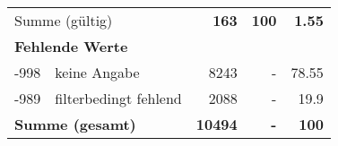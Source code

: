 \begin{longtable}{lXrrr}
     \midrule
     \multicolumn{2}{l}{Summe (gültig)} &
       \textbf{\num{163}} &
     \textbf{100} &
       \textbf{\num[round-mode=places,round-precision=2]{1,55}} \\
     \multicolumn{5}{l}{\textbf{Fehlende Werte}}\\
       -998 &
       keine Angabe &
         \num{8243} &
        - &
         \num[round-mode=places,round-precision=2]{78,55} \\
       -989 &
       filterbedingt fehlend &
         \num{2088} &
        - &
         \num[round-mode=places,round-precision=2]{19,9} \\
     \midrule
     \multicolumn{2}{l}{\textbf{Summe (gesamt)}} &
          \textbf{\num{10494}} &
        \textbf{-} &
        \textbf{100} \\
     \bottomrule
     \end{longtable}
     

